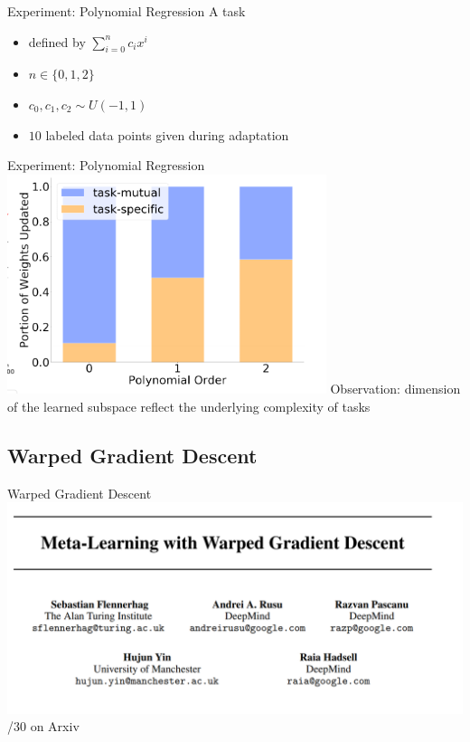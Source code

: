 \documentclass{beamer}
\begin{document}
\begin{frame}{Experiment: Polynomial Regression}
  A task
  \begin{itemize}
    \item defined by $\sum_{i=0}^n c_i x^i$
    \item $n \in \lbrace 0, 1, 2 \rbrace$
    \item $c_0, c_1, c_2 \sim U(-1,1)$
    \item $10$ labeled data points given during adaptation
  \end{itemize}

\end{frame}

\begin{frame}{Experiment: Polynomial Regression}
  \center \includegraphics[width=0.7\textwidth]{fig/MT-poly.png}
  \center Observation: dimension of the learned subspace reflect the underlying complexity of tasks
\end{frame}

\subsection{Warped Gradient Descent}
\begin{frame}{Warped Gradient Descent}
  \includegraphics[width=\textwidth]{fig/Warp-meta.png}
  /30 on Arxiv
\end{frame}
\end{document}
